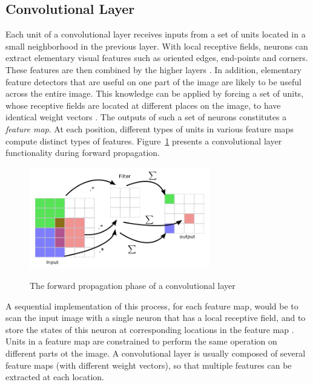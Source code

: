 \subsection{Convolutional Layer} 
\label{convlayer}
Each unit of a convolutional layer receives inputs from a set of units located in a small neighborhood in the previous layer. With local receptive fields, neurons can extract elementary visual features such as oriented edges, end-points and corners. These features are then combined by the higher layers \cite{lecun2010convolutional}. In addition, elementary feature detectors that are useful on one part of the image are likely to be useful across the entire image. This knowledge can be applied by forcing a set of units, whose receptive fields are located at different places on the image, to have identical weight vectors \cite{williams1986learning}. The outputs of such a set of neurons constitutes a \textit{feature map}. At each position, different types of units in various feature maps compute distinct types of features. Figure~\ref{fig:cnnsample} presents a convolutional layer functionality during forward propagation. 

\begin{figure}[H]
	\centering
	{\includegraphics[width=0.7\textwidth]{images/conv}}
	\caption{The forward propagation phase of a convolutional layer}
	\label{fig:cnnsample}
\end{figure}
 
A sequential implementation of this process, for each feature map, would be to scan the input image with a single neuron that has a local receptive field, and to store the states of this neuron at corresponding locations in the feature map \cite{lecun2010convolutional}. \\
\indent Units in a feature map are constrained to perform the same operation on different parts ot the image. A convolutional layer is usually composed of several feature maps (with different weight vectors), so that multiple features can be extracted at each location. 

